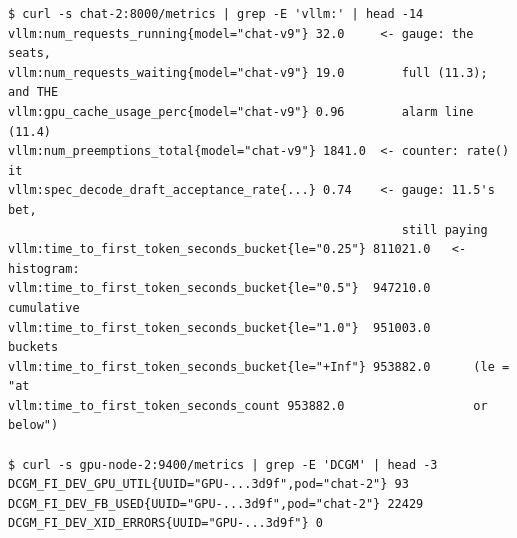 \begin{terminalbox}
\begin{Verbatim}[breaklines=true,breakanywhere=true,fontsize=\small,formatcom=\color{tbbtermfg},codes=\tbbcodeactive]
$ curl -s chat-2:8000/metrics | grep -E 'vllm:' | head -14
vllm:num_requests_running{model="chat-v9"} 32.0     <- gauge: the seats,
vllm:num_requests_waiting{model="chat-v9"} 19.0        full (11.3); and THE
vllm:gpu_cache_usage_perc{model="chat-v9"} 0.96        alarm line (11.4)
vllm:num_preemptions_total{model="chat-v9"} 1841.0  <- counter: rate() it
vllm:spec_decode_draft_acceptance_rate{...} 0.74    <- gauge: 11.5's bet,
                                                       still paying
vllm:time_to_first_token_seconds_bucket{le="0.25"} 811021.0   <- histogram:
vllm:time_to_first_token_seconds_bucket{le="0.5"}  947210.0      cumulative
vllm:time_to_first_token_seconds_bucket{le="1.0"}  951003.0      buckets
vllm:time_to_first_token_seconds_bucket{le="+Inf"} 953882.0      (le = "at
vllm:time_to_first_token_seconds_count 953882.0                  or below")

$ curl -s gpu-node-2:9400/metrics | grep -E 'DCGM' | head -3
DCGM_FI_DEV_GPU_UTIL{UUID="GPU-...3d9f",pod="chat-2"} 93
DCGM_FI_DEV_FB_USED{UUID="GPU-...3d9f",pod="chat-2"} 22429
DCGM_FI_DEV_XID_ERRORS{UUID="GPU-...3d9f"} 0
\end{Verbatim}
\end{terminalbox}


